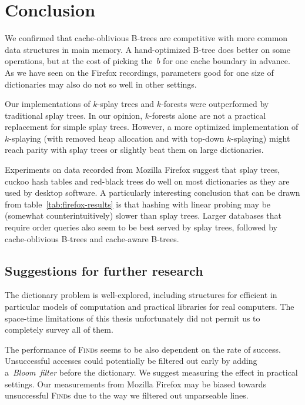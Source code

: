 \chapter*{Conclusion}

We confirmed that cache-oblivious B-trees are competitive with more common
data structures in main memory. A hand-optimized B-tree does better on some
operations, but at the cost of picking the~$b$ for one cache boundary
in advance. As we have seen on the Firefox recordings, parameters good for one
size of dictionaries may also do not so well in other settings.

Our implementations of $k$-splay trees and $k$-forests were outperformed
by traditional splay trees. In our opinion, $k$-forests alone are not
a practical replacement for simple splay trees. However, a more optimized
implementation of $k$-splaying (with removed heap allocation and with top-down
$k$-splaying) might reach parity with splay trees or slightly beat them
on large dictionaries.

Experiments on data recorded from Mozilla Firefox suggest that splay trees,
cuckoo hash tables and red-black trees do well on most dictionaries as they
are used by desktop software. A particularly interesting conclusion that can be
drawn from table~\ref{tab:firefox-results} is that hashing with linear probing
may be (somewhat counterintuitively) slower than splay trees.
Larger databases that require order queries also seem to be best served
by splay trees, followed by cache-oblivious \mbox{B-trees} and cache-aware
\mbox{B-trees}.

\section*{Suggestions for further research}
The dictionary problem is well-explored, including structures for efficient
in particular models of computation and practical libraries for real computers.
The space-time limitations of this thesis unfortunately did not permit us to
completely survey all of them.

The performance of \textsc{Find}s seems to be also dependent on
the rate of success. Unsuccessful accesses could potentially be filtered out
early by adding a~\emph{Bloom~filter}\cite{bloom} before the dictionary.
We suggest measuring the effect in practical settings. Our measurements from
Mozilla Firefox may be biased towards unsuccessful \textsc{Find}s due to the
way we filtered out unparseable lines.

